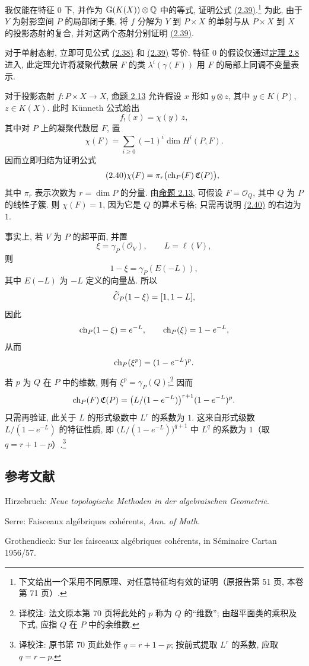 我仅能在特征 \(0\) 下, 并作为 \(\mathrm{G}(K(X))\otimes\mathbb Q\) 中的等式, 证明公式 \hyperlink{sga6.e00.eq.2-39}{(2.39)}.\footnote{下文给出一个采用不同原理、对任意特征均有效的证明（原报告第 51 页, 本卷第 71 页）.} 为此, 由于 \(Y\) 为射影空间 \(P\) 的局部闭子集, 将 \(f\) 分解为 \(Y\) 到 \(P\times X\) 的单射与从 \(P\times X\) 到 \(X\) 的投影态射的复合, 并对这两个态射分别证明 \hyperlink{sga6.e00.eq.2-39}{(2.39)}.

对于单射态射, 立即可见公式 \hyperlink{sga6.e00.eq.2-38}{(2.38)} 和 \hyperlink{sga6.e00.eq.2-39}{(2.39)} 等价. 特征 \(0\) 的假设仅通过\hyperlink{sga6.e00.thm.2-8}{定理 2.8} 进入, 此定理允许将凝聚代数层 \(F\) 的类 \(\lambda^i(\gamma(F))\) 用 \(F\) 的局部上同调不变量表示.

对于投影态射 \(f:P\times X\to X\), \hyperlink{sga6.e00.prop.2-13}{命题 2.13} 允许假设 \(x\) 形如 \(y\otimes z\), 其中 \(y\in K(P)\), \(z\in K(X)\). 此时 Künneth 公式给出
\[
  f_!(x)=\chi(y)\,z,
\]
其中对 \(P\) 上的凝聚代数层 \(F\), 置
\[
  \chi(F)=\sum_{i\geq 0}(-1)^i\dim H^i(P,F).
\]
因而立即归结为证明公式
\begin{equation}\tag{2.40}
  \chi(F)=\pi_r\bigl(\operatorname{ch}_P(F)\,\mathfrak C(P)\bigr),
\end{equation}
其中 \(\pi_r\) 表示次数为 \(r=\dim P\) 的分量. 由\hyperlink{sga6.e00.prop.2-13}{命题 2.13}, 可假设 \(F=\mathcal O_Q\), 其中 \(Q\) 为 \(P\) 的线性子簇. 则 \(\chi(F)=1\), 因为它是 \(Q\) 的算术亏格; 只需再说明 \hyperlink{sga6.e00.eq.2-40}{(2.40)} 的右边为 \(1\).

事实上, 若 \(V\) 为 \(P\) 的超平面, 并置
\[
  \xi=\gamma_P(\mathcal O_V),\qquad L=\ell(V),
\]
则
\[
  1-\xi=\gamma_P(E(-L)),
\]
其中 \(E(-L)\) 为 \(-L\) 定义的向量丛. 所以
\[
  \widetilde C_P(1-\xi)=[1,1-L],
\]
因此
\[
  \operatorname{ch}_P(1-\xi)=e^{-L},\qquad \operatorname{ch}_P(\xi)=1-e^{-L},
\]
从而
\[
  \operatorname{ch}_P(\xi^p)=(1-e^{-L})^p.
\]
若 \(p\) 为 \(Q\) 在 \(P\) 中的维数, 则有 \(\xi^p=\gamma_P(Q)\);\footnote{译校注: 法文原本第 70 页将此处的 $p$ 称为 $Q$ 的“维数”; 由超平面类的乘积及下式, 应指 $Q$ 在 $P$ 中的余维数.} 因而
\[
  \operatorname{ch}_P(F)\,\mathfrak C(P)
  =
  \bigl(L/(1-e^{-L})\bigr)^{r+1}(1-e^{-L})^p.
\]
只需再验证, 此关于 \(L\) 的形式级数中 \(L^r\) 的系数为 \(1\). 这来自形式级数 \(L/(1-e^{-L})\) 的特征性质, 即 \(\bigl(L/(1-e^{-L})\bigr)^{q+1}\) 中 \(L^q\) 的系数为 \(1\)（取 \(q=r+1-p\)）.\footnote{译校注: 原书第 70 页此处作 \(q=r+1-p\); 按前式提取 \(L^r\) 的系数, 应取 \(q=r-p\).}

\subsection*{参考文献}
\begin{enumerate}[label={[\arabic*]}]
\item Hirzebruch: \emph{Neue topologische Methoden in der algebraischen Geometrie}.
\item Serre: Faisceaux algébriques cohérents, \emph{Ann. of Math.}
\item Grothendieck: Sur les faisceaux algébriques cohérents, in Séminaire Cartan 1956/57.
\end{enumerate}

